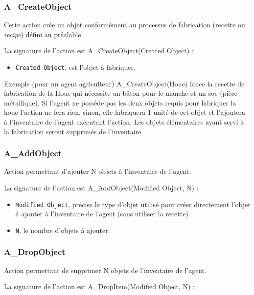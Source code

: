 \subsubsection{A\_CreateObject} 


Cette action crée un objet conformément au processus de fabrication (recette ou \textit{recipe}) défini au préalable. 

La signature de l'action  est A\_CreateObject(Created Object) :
	\begin{itemize}
	\item \texttt{Created Object}, est l'objet à fabriquer.
	\end{itemize}
	
Exemple (pour un agent agriculteur) A\_CreateObject(Houe) lance la recette de fabrication de la Houe qui nécessite un bâton pour le manche et un soc (pièce métallique).
	Si l'agent ne possède pas les deux objets requis pour fabriquer la houe l'action ne fera rien, sinon, elle fabriquera 1 unité de cet objet et l'ajoutera à l'inventaire de l'agent exécutant l'action. Les objets élémentaires ayant servi à la fabrication seront supprimés de l'inventaire.

\subsubsection{A\_AddObject}
Action permettant d'ajouter N objets à l'inventaire de l'agent.  

La signature de l'action est A\_AddObject(Modified Object, N) :
	\begin{itemize}
	\item \texttt{Modified Object}, précise le type d'objet utilisé pour créer directement l'objet à ajouter à l'inventaire de l'agent (sans utiliser la recette)
	\item \texttt{N}, le nombre d'objets à ajouter.
	\end{itemize}
	
	
\subsubsection{A\_DropObject}  
Action permettant de supprimer N objets de l'inventaire de l'agent.  

La signature de l'action est A\_DropItem(Modified Object, N) :	
	
